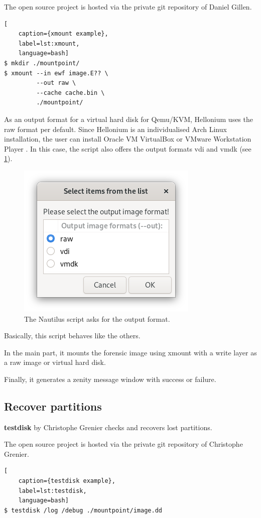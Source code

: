 The open source project is hosted via the private git repository \cite{xmount} of Daniel Gillen.

\begin{lstlisting}[
    caption={xmount example},
    label=lst:xmount,
    language=bash]
$ mkdir ./mountpoint/
$ xmount --in ewf image.E?? \
         --out raw \
         --cache cache.bin \
         ./mountpoint/
\end{lstlisting}

\noindent As an output format for a virtual hard disk for Qemu/KVM, Hellonium uses the raw format per default.
Since Hellonium is an individualised Arch Linux installation, the user can install Oracle VM VirtualBox \cite{Virtualbox} or VMware Workstation Player \cite{VMware}. In this case, the script also offers the output formats vdi and vmdk (see \cref{fig:xmount}).

\begin{figure}[htbp]  %
  \centering
  \includegraphics[width=.25\textwidth]{figures/xmount.png}
  \caption[xmount output format]{The Nautilus script asks for the output format.}
  \label{fig:xmount}
\end{figure}

\noindent Basically, this script behaves like the others.

In the main part, it mounts the forensic image using xmount with a write layer as a raw image or virtual hard disk.

Finally, it generates a zenity message window with success or failure.

\subsection{Recover partitions}

\textbf{testdisk} by Christophe Grenier checks and recovers lost partitions.

The open source project is hosted via the private git repository \cite{Testdisk} of Christophe Grenier.

\begin{lstlisting}[
    caption={testdisk example},
    label=lst:testdisk,
    language=bash]
$ testdisk /log /debug ./mountpoint/image.dd
\end{lstlisting}

